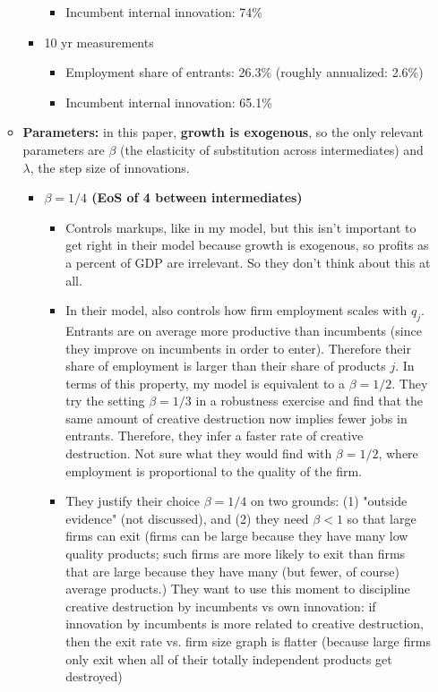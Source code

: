 \documentclass[12pt,english]{article}
\theoremstyle{remark}
\begin{document}
\begin{itemize}
\begin{itemize}
\begin{itemize}
\begin{itemize}
				\item Incumbent internal innovation: 74\%
			\end{itemize}
			\item 10 yr measurements
			\begin{itemize}
				\item Employment share of entrants: 26.3\% (roughly annualized: 2.6\%)
				\item Incumbent internal innovation: 65.1\%
			\end{itemize}
		\end{itemize}
		\item \textbf{Parameters:} in this paper, \textbf{growth is exogenous}, so the only relevant parameters are $\beta$ (the elasticity of substitution across intermediates) and $\lambda$, the step size of innovations. 
		\begin{itemize}
			\item \textbf{$\beta = 1/4$ (EoS of 4 between intermediates)}
			\begin{itemize}
				\item Controls markups, like in my model, but this isn't important to get right in their model because growth is exogenous, so profits as a percent of GDP are irrelevant. So they don't think about this at all.
				\item In their model, also controls how firm employment scales with $q_j$. Entrants are on average more productive than incumbents (since they improve on incumbents in order to enter). Therefore their share of employment is larger than their share of products $j$. In terms of this property, my model is equivalent to a $\beta = 1/2$. They try the setting $\beta = 1/3$ in a robustness exercise and find that the same amount of creative destruction now implies fewer jobs in entrants. Therefore, they infer a faster rate of creative destruction. Not sure what they would find with $\beta = 1/2$, where employment is proportional to the quality of the firm.
				\item They justify their choice $\beta = 1/4$ on two grounds: (1) "outside evidence" (not discussed), and (2) they need $\beta < 1$ so that large firms can exit (firms can be large because they have many low quality products; such firms are more likely to exit than firms that are large because they have many (but fewer, of course) average products.) They want to use this moment to discipline creative destruction by incumbents vs own innovation: if innovation by incumbents is more related to creative destruction, then the exit rate vs. firm size graph is flatter (because large firms only exit when all of their totally independent products get destroyed)

\end{itemize}
\end{itemize}
\end{itemize}
\end{itemize}
\end{document}
